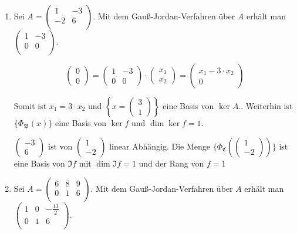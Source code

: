 \documentclass{article}
\begin{document}
\begin{enumerate}[1)]
\item
  Sei $A = \begin{pmatrix}
    1  & -3 \\
    -2 & 6  \\
  \end{pmatrix}$. Mit dem Gauß-Jordan-Verfahren über $A$ erhält man
  $\begin{pmatrix}
    1 & -3 \\
    0 &  0 \\
  \end{pmatrix}$.

  \[
    \begin{pmatrix}0\\0\end{pmatrix} = \begin{pmatrix}1&-3\\0&0\end{pmatrix} \cdot \begin{pmatrix}x_1\\x_2\end{pmatrix} =
    \begin{pmatrix}x_1 - 3\cdot x_2\\0\end{pmatrix}
  \]

  Somit ist $x_1 = 3 \cdot x_2$ und $\left\{ x = \begin{pmatrix}3\\1\end{pmatrix}\right\}$ eine Basis von $\ker A.$.
  Weiterhin ist $\{ \Phi_\mathfrak{B}(x)\}$  eine Basis von $\ker f$ und $\dim \ker f = 1$.
  
  $\begin{pmatrix}-3\\6\end{pmatrix}$ ist von $\begin{pmatrix}1\\-2\end{pmatrix}$ linear Abhängig.
  Die Menge $\{ \Phi_\mathfrak{C}(\begin{pmatrix}1\\-2\end{pmatrix})\}$ ist eine Basis von $\Im f$ mit $\dim \Im f = 1$ und
  der Rang von $f = 1$ 

\item
  Sei $A = \begin{pmatrix}
    6 & 8 & 9 \\
    0 & 1 & 6 \\
  \end{pmatrix}$. Mit dem Gauß-Jordan-Verfahren über $A$ erhält man
  $\begin{pmatrix}
    1 & 0 & -\frac{13}{2} \\
    0 & 1 & 6             \\
  \end{pmatrix}$.


\end{enumerate}
\end{document}
